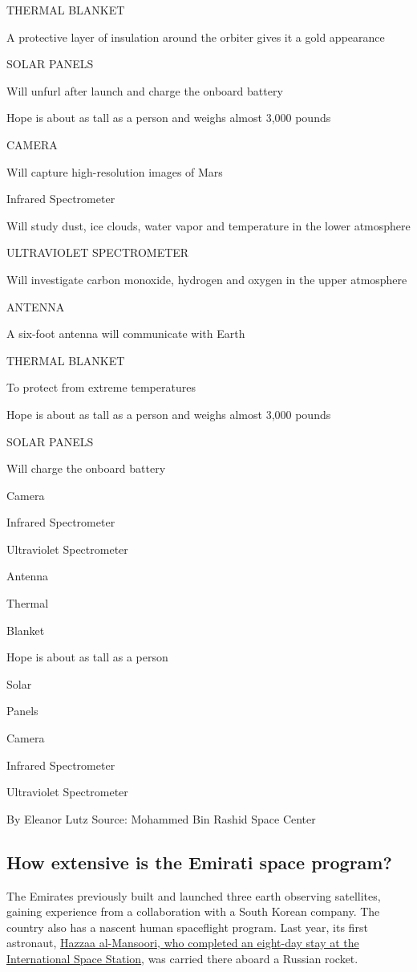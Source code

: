 THERMAL BLANKET

A protective layer of insulation around the orbiter gives it a gold
appearance

SOLAR PANELS

Will unfurl after launch and charge the onboard battery

Hope is about as tall as a person and weighs almost 3,000 pounds

CAMERA

Will capture high-resolution images of Mars

Infrared Spectrometer

Will study dust, ice clouds, water vapor and temperature in the lower
atmosphere

ULTRAVIOLET SPECTROMETER

Will investigate carbon monoxide, hydrogen and oxygen in the upper
atmosphere

ANTENNA

A six-foot antenna will communicate with Earth

THERMAL BLANKET

To protect from extreme temperatures

Hope is about as tall as a person and weighs almost 3,000 pounds

SOLAR PANELS

Will charge the onboard battery

Camera

Infrared Spectrometer

Ultraviolet Spectrometer

Antenna

Thermal

Blanket

Hope is about as tall as a person

Solar

Panels

Camera

Infrared Spectrometer

Ultraviolet Spectrometer

By Eleanor Lutz \textbar{} Source: Mohammed Bin Rashid Space Center

\hypertarget{how-extensive-is-the-emirati-space-program}{%
\subsection{How extensive is the Emirati space
program?}\label{how-extensive-is-the-emirati-space-program}}

The Emirates previously built and launched three earth observing
satellites, gaining experience from a collaboration with a South Korean
company. The country also has a nascent human spaceflight program. Last
year, its first astronaut,
\href{https://www.nytimes3xbfgragh.onion/2019/09/25/science/emirati-astronaut-uae-international-space-station.html}{Hazzaa
al-Mansoori, who completed an eight-day stay at the International Space
Station}, was carried there aboard a Russian rocket.

